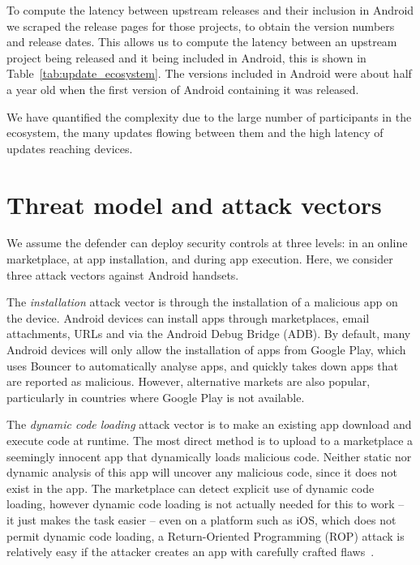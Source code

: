 \documentclass{sig-alternate-2013}
\let\OldTodo\todo
\renewcommand{\todo}{\OldTodo[inline]}
\begin{document}
To compute the latency between upstream releases and their inclusion in Android we scraped the release pages for those projects, to obtain the version numbers and release dates.
This allows us to compute the latency between an upstream project being released and it being included in Android, this is shown in Table~\ref{tab:update_ecosystem}.
The versions included in Android were about half a year old when the first version of Android containing it was released.

We have quantified the complexity due to the large number of participants in the ecosystem, the many updates flowing between them and the high latency of updates reaching devices.

\vspace{0.1em}\todo{Remove this display hack}
\section{Threat model and attack vectors}
\label{sec:threatmodel}

We assume the defender can deploy security controls at three levels: in an online marketplace, at app installation, and during app execution.
Here, we consider three attack vectors against Android handsets.

The \emph{installation} attack vector is through the installation of a malicious app on the device.
Android devices can install apps through marketplaces, email attachments, URLs and via the Android Debug Bridge (ADB).
By default, many Android devices will only allow the installation of apps from Google Play, which uses Bouncer to automatically analyse apps, and quickly takes down apps that are reported as malicious.
However, alternative markets are also popular, particularly in countries where Google Play is not available.

The \emph{dynamic code loading} attack vector is to make an existing app download and execute code at runtime.
The most direct method is to upload to a marketplace a seemingly innocent app that dynamically loads malicious code.
Neither static nor dynamic analysis of this app will uncover any malicious code, since it does not exist in the app.
The marketplace can detect explicit use of dynamic code loading, however dynamic code loading is not actually needed for this to work -- it just makes the task easier -- even on a platform such as iOS, which does not permit dynamic code loading, a Return-Oriented Programming (ROP) attack is relatively easy if the attacker creates an app with carefully crafted flaws~\cite{Wang2013a}.
\end{document}
